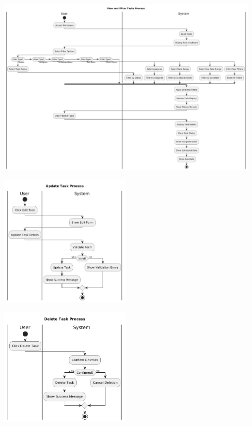 \begin{center}
    \includegraphics[width=1\textwidth]{assets/activity_diagrams/task_read.png}
\end{center}

\begin{center}
    \includegraphics[width=0.5\textwidth]{assets/activity_diagrams/task_update.png}
\end{center}

\begin{center}
    \includegraphics[width=0.5\textwidth]{assets/activity_diagrams/task_delete.png}
\end{center}

